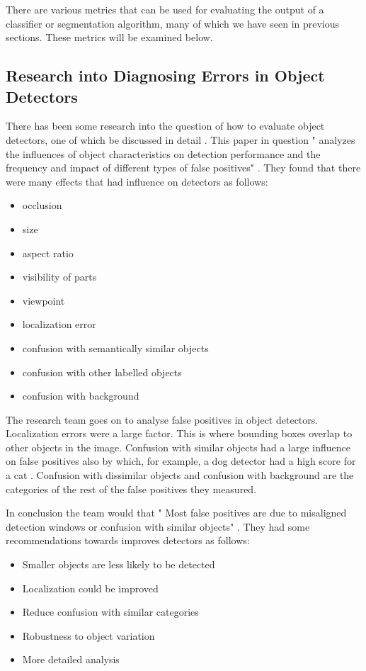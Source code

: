 There are various metrics that can be used for evaluating the output
of a classifier or segmentation algorithm, many of which we have seen in previous
sections. These metrics will be examined below.

\subsection*{Research into Diagnosing Errors in Object Detectors}
There has been some research into the question of how to evaluate object
detectors, one of which be discussed in detail \parencite{diagnosingErrors}.
This paper in question " analyzes the influences of object characteristics on
detection performance and the frequency and impact of different types of false
positives" \parencite{diagnosingErrors}. They found that there were many effects
that had influence on detectors as follows:
\begin{itemize}
    \item{occlusion}
    \item{size}
    \item{aspect ratio}
    \item{visibility of parts}
    \item{viewpoint}
    \item{localization error}
    \item{confusion with semantically similar objects}
    \item{confusion with other labelled objects}
    \item{confusion with background}
\end{itemize}

The research team goes on to analyse false positives in object detectors.
Localization errors were a large factor. This is where bounding boxes overlap to
other objects in the image. Confusion with similar objects had a large influence
on false positives also by which, for example, a dog detector had a high score
for a cat \parencite{diagnosingErrors}. Confusion with dissimilar objects and
confusion with background are the categories of the rest of the false positives
they measured.

In conclusion the team would that " Most false positives are due to misaligned
detection windows or confusion with similar objects"
\parencite{diagnosingErrors}. They had some recommendations towards improves
detectors as follows:
\begin{itemize}
	\item{Smaller objects are less likely to be detected}
	\item{Localization could be improved}
	\item{Reduce confusion with similar categories}
	\item{Robustness to object variation}
	\item{More detailed analysis}
\end{itemize}

